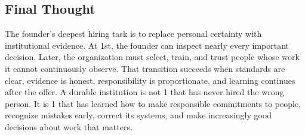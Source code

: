\subsection*{Final Thought}

The founder's deepest hiring task is to replace personal certainty with institutional evidence. At 1st, the founder can inspect nearly every important decision. Later, the organization must select, train, and trust people whose work it cannot continuously observe. That transition succeeds when standards are clear, evidence is honest, responsibility is proportionate, and learning continues after the offer. A durable institution is not 1 that has never hired the wrong person. It is 1 that has learned how to make responsible commitments to people, recognize mistakes early, correct its systems, and make increasingly good decisions about work that matters.
